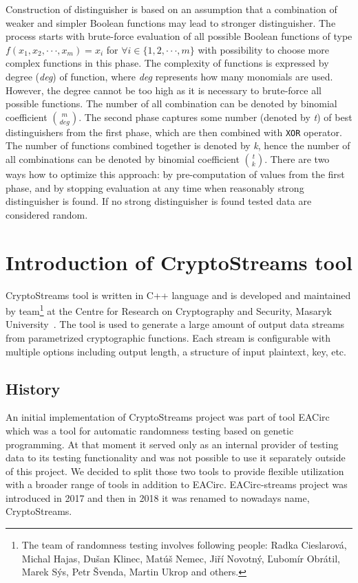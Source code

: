 \documentclass[
    digital,    %
    oneside,    %
    color,
    11pt,
    nocover,
    notable,
    nolof,
    nolot,
    final
]{fithesis3}
\renewcommand\_{\textunderscore\allowbreak}
\begin{document}
Construction of distinguisher is based on an assumption that a combination of weaker and simpler Boolean functions may lead to stronger distinguisher. The process starts with brute-force evaluation of all possible Boolean functions of type  $f(x_{1}, x_{2}, \cdot \cdot \cdot, x_{m}) = x_{i}$ for $\forall i \in \{1, 2, \cdot \cdot \cdot, m\}$ with possibility to choose more complex functions in this phase. The complexity of functions is expressed by degree (\textit{deg}) of function, where \textit{deg} represents how many monomials are used. However, the degree cannot be too high as it is necessary to brute-force all possible functions. The number of all combination can be denoted by binomial coefficient ${m}\choose{deg}$. The second phase captures some number (denoted by \textit{t}) of best distinguishers from the first phase, which are then combined with \texttt{XOR} operator. The number of functions combined together is denoted by \textit{k}, hence the number of all combinations can be denoted by binomial coefficient ${t}\choose{k}$. There are two ways how to optimize this approach: by pre-computation of values from the first phase, and by stopping evaluation at any time when reasonably strong distinguisher is found. If no strong distinguisher is found tested data are considered random. \cite{booltest-secrypt2017}

\chapter{Introduction of CryptoStreams tool}
\label{chap:cryptostreams}

CryptoStreams tool is written in C++ language and is developed and maintained by team\footnote{The team of randomness testing involves following people: Radka Cieslarová, Michal Hajas, Dušan Klinec, Matúš Nemec, Jiří Novotný, Ľubomír Obrátil, Marek Sýs, Petr Švenda, Martin Ukrop and others.} at the Centre for Research on Cryptography and Security, Masaryk University~\cite{CryptoStreams}. The tool is used to generate a large amount of output data streams from parametrized cryptographic functions. Each stream is configurable with multiple options including output length, a structure of input plaintext, key, etc. 

\section{History}

An initial implementation of CryptoStreams project was part of tool EACirc~\cite{EACirc} which was a tool for automatic randomness testing based on genetic programming. At that moment it served only as an internal provider of testing data to its testing functionality and was not possible to use it separately outside of this project. We decided to split those two tools to provide flexible utilization with a broader range of tools in addition to EACirc. EACirc-streams project was introduced in 2017 and then in 2018 it was renamed to nowadays name, CryptoStreams.
\end{document}
